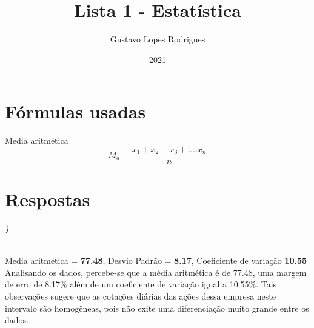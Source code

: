 \documentclass[12pt]{article}
\title{\textbf{Lista 1 - Estatística}}
\author{Gustavo Lopes Rodrigues}
\date{2021}
\newcounter{instn}
\newcommand{\instnum}{\arabic{instn}}
\newcommand{\myline}[1]{
    \emph{\textbf{#1)}}
    \addtocounter{instn}{1}
}
\newenvironment{question}[1]
 {
    \myline{\instnum} \\#1\\[1ex]
    }
    {
 }
\newenvironment{formula}[1]
 {
    #1\\
    }
    {
 }
\begin{document}
    
    \maketitle

    \section*{Fórmulas usadas}

    \begin{formula}{Media aritmética}
        \[ M_a = \frac{x_1 + x_2 + x_3 + .... x_n }{n} \]
    \end{formula}

    \newpage

    \section*{Respostas}

    \begin{question}{Media aritmética = \textbf{77.48}, Desvio Padrão = \textbf{8.17}, Coeficiente de variação \textbf{10.55}}
        Analisando os dados, percebe-se que a média aritmética é de 77.48, uma margem de erro de 8.17\% além 
        de um coeficiente de variação igual a 10.55\%. Tais observações sugere que 
        as cotações diárias das ações dessa empresa neste intervalo são homogêneas, pois não exite 
        uma diferenciação muito grande entre os dados.
    \end{question}
\end{document}
